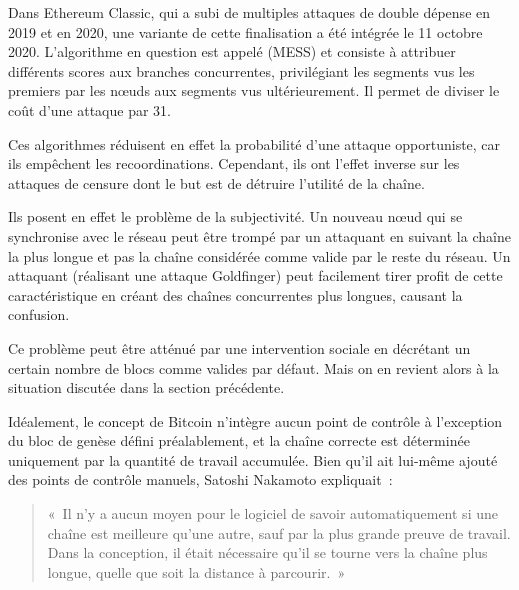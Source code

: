 Dans Ethereum Classic, qui a subi de multiples attaques de double dépense en 2019 et en 2020, une variante de cette finalisation a été intégrée le 11 octobre 2020. L'algorithme en question est appelé  (MESS) et consiste à attribuer différents scores aux branches concurrentes, privilégiant les segments vus les premiers par les nœuds aux segments vus ultérieurement. Il permet de diviser le coût d'une attaque par 31.

Ces algorithmes réduisent en effet la probabilité d'une attaque opportuniste, car ils empêchent les recoordinations. Cependant, ils ont l'effet inverse sur les attaques de censure dont le but est de détruire l'utilité de la chaîne.

Ils posent en effet le problème de la subjectivité. Un nouveau nœud qui se synchronise avec le réseau peut être trompé par un attaquant en suivant la chaîne la plus longue et pas la chaîne considérée comme valide par le reste du réseau. Un attaquant (réalisant une attaque Goldfinger) peut facilement tirer profit de cette caractéristique en créant des chaînes concurrentes plus longues, causant la confusion.

Ce problème peut être atténué par une intervention sociale en décrétant un certain nombre de blocs comme valides par défaut. Mais on en revient alors à la situation discutée dans la section précédente.

Idéalement, le concept de Bitcoin n'intègre aucun point de contrôle à l'exception du bloc de genèse défini préalablement, et la chaîne correcte est déterminée uniquement par la quantité de travail accumulée. Bien qu'il ait lui-même ajouté des points de contrôle manuels, Satoshi Nakamoto expliquait~:

\begin{quote}
«~Il n'y a aucun moyen pour le logiciel de savoir automatiquement si une chaîne est meilleure qu'une autre, sauf par la plus grande preuve de travail. Dans la conception, il était nécessaire qu'il se tourne vers la chaîne plus longue, quelle que soit la distance à parcourir.~»
\end{quote}

